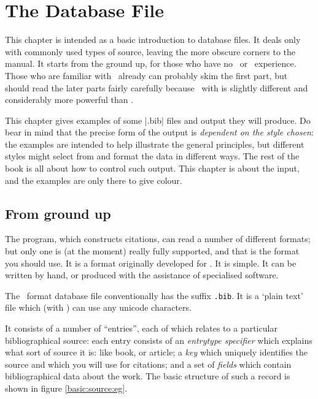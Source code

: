 \chapter{The Database File}

This chapter is intended as a basic introduction to database files. It deals only with commonly used types of source, leaving the more obscure corners to the manual. It starts from the ground up, for those who have no \bibtex\ or \biblatex\ experience. Those who are familiar with \bibtex\ already can probably skim the first part, but should read the later parts fairly carefully because \biblatex\, with  is slightly different and considerably more powerful than \bibtex.

This chapter gives examples of some |.bib| files and output they will produce. Do bear in mind that the precise form of the output is \emph{dependent on the style chosen}: the examples are intended to help illustrate the general principles, but different styles might select from and format the data in different ways. The rest of the book is all about how to control such output. This chapter is about the input, and the examples are only there to give colour.

\section{From ground up}

The  program, which constructs citations, can read a number of different formats; but only one is (at the moment) really fully supported, and that is the format you should use. It is a format originally developed for \bibtex. It is simple. It can be written by hand, or produced with the assistance of specialised software.

The \bibtex\ format database file conventionally has the suffix \verb|.bib|. It is a `plain text' file which (with ) can use any unicode characters.

It consists of a number of ``entries'', each of which relates to a particular bibliographical source: each entry consists of an \emph{entrytype specifier} which explains what sort of source it is: like book, or article; a \emph{key} which uniquely identifies the source and which you will use for citations; and a set of \emph{fields} which contain bibliographical data about the work. The basic structure of such a record is shown in figure \ref{basic:source:eg}.

